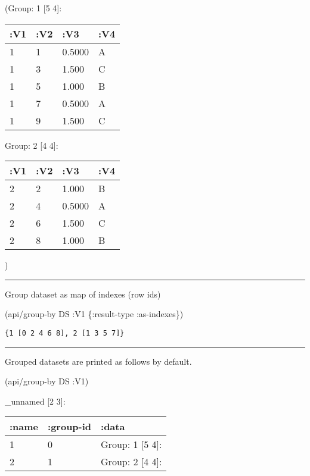 \documentclass[]{article}
\newenvironment{Shaded}{\begin{snugshade}}{\end{snugshade}}
\newcommand{\AttributeTok}[1]{\textcolor[rgb]{0.77,0.63,0.00}{#1}}
\newcommand{\NormalTok}[1]{#1}
\begin{document}
(Group: 1 {[}5 4{]}:

\begin{longtable}[]{@{}llll@{}}
\toprule
:V1 & :V2 & :V3 & :V4\tabularnewline
\midrule
\endhead
1 & 1 & 0.5000 & A\tabularnewline
1 & 3 & 1.500 & C\tabularnewline
1 & 5 & 1.000 & B\tabularnewline
1 & 7 & 0.5000 & A\tabularnewline
1 & 9 & 1.500 & C\tabularnewline
\bottomrule
\end{longtable}

Group: 2 {[}4 4{]}:

\begin{longtable}[]{@{}llll@{}}
\toprule
:V1 & :V2 & :V3 & :V4\tabularnewline
\midrule
\endhead
2 & 2 & 1.000 & B\tabularnewline
2 & 4 & 0.5000 & A\tabularnewline
2 & 6 & 1.500 & C\tabularnewline
2 & 8 & 1.000 & B\tabularnewline
\bottomrule
\end{longtable}

)

\begin{center}\rule{0.5\linewidth}{0.5pt}\end{center}

Group dataset as map of indexes (row ids)

\begin{Shaded}
\begin{Highlighting}[]
\NormalTok{(api/group-by DS }\AttributeTok{:V1}\NormalTok{ \{}\AttributeTok{:result-type} \AttributeTok{:as-indexes}\NormalTok{\})}
\end{Highlighting}
\end{Shaded}

\begin{verbatim}
{1 [0 2 4 6 8], 2 [1 3 5 7]}
\end{verbatim}

\begin{center}\rule{0.5\linewidth}{0.5pt}\end{center}

Grouped datasets are printed as follows by default.

\begin{Shaded}
\begin{Highlighting}[]
\NormalTok{(api/group-by DS }\AttributeTok{:V1}\NormalTok{)}
\end{Highlighting}
\end{Shaded}

\_unnamed {[}2 3{]}:

\begin{longtable}[]{@{}lll@{}}
\toprule
:name & :group-id & :data\tabularnewline
\midrule
\endhead
1 & 0 & Group: 1 {[}5 4{]}:\tabularnewline
2 & 1 & Group: 2 {[}4 4{]}:\tabularnewline
\bottomrule
\end{longtable}
\end{document}
